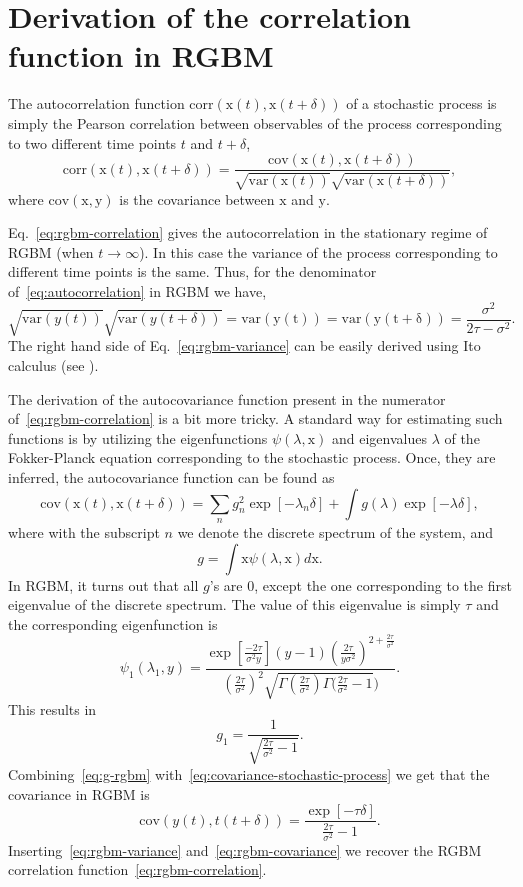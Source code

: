 \documentclass[11pt]{article}
\newcommand{\be}{\begin{equation}}
\newcommand{\ee}{\end{equation}}
\numberwithin{equation}{section}
\begin{document}
\section{Derivation of the correlation function in RGBM}\label{sec:rgbm-correlation-function}

The autocorrelation function $\mathrm{corr}(\mathrm{x}(t), \mathrm{x}(t+\delta))$ of a stochastic process is simply the Pearson correlation between observables of the process corresponding to two different time points $t$ and $t+\delta$, 
\be
    \mathrm{corr}(\mathrm{x}(t), \mathrm{x}(t+\delta)) = \frac{\mathrm{cov}(\mathrm{x}(t), \mathrm{x}(t+\delta))}{\sqrt{\mathrm{var}(\mathrm{x}(t))} \sqrt{\mathrm{var}(\mathrm{x}(t+\delta))}},
    \label{eq:autocorrelation}
\ee
where $\mathrm{cov}(\mathrm{x}, \mathrm{y})$ is the covariance between $\mathrm{x}$ and $\mathrm{y}$.

Eq.~\eqref{eq:rgbm-correlation} gives the autocorrelation in the stationary regime of RGBM (when $t \to \infty$). In this case the variance of the process corresponding to different time points is the same. Thus, for the denominator of~\eqref{eq:autocorrelation} in RGBM we have,
\be
   \sqrt{\mathrm{var}(y(t))} \sqrt{\mathrm{var}(y(t+\delta))} = \mathrm{var(y(t))} = \mathrm{var(y(t+\delta))} = \frac{\sigma^2}{2\tau - \sigma^2}.
    \label{eq:rgbm-variance}
\ee
The right hand side of Eq.~\eqref{eq:rgbm-variance} can be easily derived using Ito calculus (see \citet{BermanPetersAdamou2019}).

The derivation of the autocovariance function present in the numerator of~\eqref{eq:rgbm-correlation} is a bit more tricky. A standard way for estimating such functions is by utilizing the eigenfunctions $\psi(\lambda,\mathrm{x})$ and eigenvalues $\lambda$ of the Fokker-Planck equation corresponding to the stochastic process. Once, they are inferred, the autocovariance function can be found as
\be
\mathrm{cov}(\mathrm{x}(t), \mathrm{x}(t+\delta)) = \sum_n g_n^2 \exp\left[ -\lambda_n \delta \right] + \int g(\lambda)\exp\left[ -\lambda \delta \right],
\label{eq:covariance-stochastic-process}
\ee
where with the subscript $n$ we denote the discrete spectrum of the system, and
\be
g = \int \mathrm{x} \psi(\lambda,\mathrm{x}) d\mathrm{x}.
\ee
In RGBM, it turns out that all $g$'s are 0, except the one corresponding to the first eigenvalue of the discrete spectrum. The value of this eigenvalue is simply $\tau$ and the corresponding eigenfunction is \citep{LiuSerota2017}
%
\be
\psi_1(\lambda_1,y) = \frac{\exp\left[\frac{-2\tau}{\sigma^2 y}\right](y-1) (\frac{2\tau}{y \sigma^2})^{2+\frac{2\tau}{\sigma^2}}}{(\frac{2\tau}{\sigma^2})^2\sqrt{\Gamma (\frac{2\tau}{\sigma^2}) \Gamma (\frac{2\tau}{\sigma^2}-1})}.
\label{eq:eigenfunction-rgbm}
\ee
This results in
\be
g_1 = \frac{1}{\sqrt{\frac{2\tau}{\sigma^2}-1}}.
\label{eq:g-rgbm}
\ee
Combining~\eqref{eq:g-rgbm} with~\ref{eq:covariance-stochastic-process} we get that the covariance in RGBM is
\be
\mathrm{cov}(y(t), t(t+\delta)) = \frac{\exp\left[-\tau \delta\right]}{\frac{2\tau}{\sigma^2}-1}.
\label{eq:rgbm-covariance}
\ee
Inserting~\eqref{eq:rgbm-variance} and~\eqref{eq:rgbm-covariance} we recover the RGBM correlation function~\eqref{eq:rgbm-correlation}.
\end{document}
